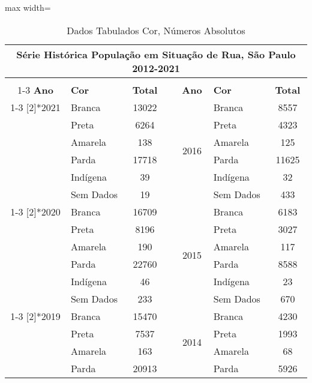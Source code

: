 \documentclass[14pt]{extarticle}
\begin{document}
\begin{table}[htbp]
  \centering
  \caption{Dados Tabulados Cor, Números Absolutos}
  \tabcolsep=0.15cm
	\renewcommand{\arraystretch}{1.0}
	\begin{adjustbox}{max width=\linewidth}
    \begin{tabular}{clccclc}
    \toprule
    \multicolumn{7}{c}{Série Histórica População em Situação de Rua, São Paulo 2012-2021} \\
    \midrule
         &      &      &      &      &      &  \\
\cmidrule{1-3}\cmidrule{5-7}    \rowcolor[rgb]{ .906,  .902,  .902} \textbf{Ano} & \multicolumn{1}{l}{\textbf{Cor}} & \textbf{Total} & \cellcolor[rgb]{ 1,  1,  1} & \textbf{Ano} & \multicolumn{1}{l}{\textbf{Cor}} & \textbf{Total} \\
\cmidrule{1-3}\cmidrule{5-7}    \multirow{6}[2]{*}{2021} & Branca & 13022 &      & \multirow{6}[2]{*}{2016} & Branca & 8557 \\
         & Preta & 6264 &      &      & Preta & 4323 \\
         & Amarela & 138  &      &      & Amarela & 125 \\
         & Parda & 17718 &      &      & Parda & 11625 \\
         & Indígena & 39   &      &      & Indígena & 32 \\
         & Sem Dados & 19   &      &      & Sem Dados & 433 \\
\cmidrule{1-3}\cmidrule{5-7}    \multirow{6}[2]{*}{2020} & Branca & 16709 &      & \multirow{6}[2]{*}{2015} & Branca & 6183 \\
         & Preta & 8196 &      &      & Preta & 3027 \\
         & Amarela & 190  &      &      & Amarela & 117 \\
         & Parda & 22760 &      &      & Parda & 8588 \\
         & Indígena & 46   &      &      & Indígena & 23 \\
         & Sem Dados & 233  &      &      & Sem Dados & 670 \\
\cmidrule{1-3}\cmidrule{5-7}    \multirow{6}[2]{*}{2019} & Branca & 15470 &      & \multirow{6}[2]{*}{2014} & Branca & 4230 \\
         & Preta & 7537 &      &      & Preta & 1993 \\
         & Amarela & 163  &      &      & Amarela & 68 \\
         & Parda & 20913 &      &      & Parda & 5926 \\

\end{tabular}
\end{adjustbox}
\end{table}
\end{document}
